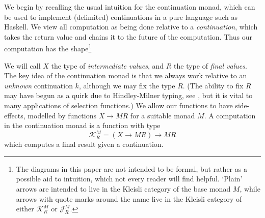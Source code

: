 \documentclass{article}
\newcommand\J{\mathscr J}
\newcommand\K{\mathscr K}
\begin{document}
We begin by recalling the usual intuition for the continuation monad, which can be used to implement (delimited) continuations in a pure language such as Haskell. We view all computation as being done relative to a \emph{continuation}, which takes the return value and chains it to the future of the computation. Thus our computation has the shape\footnote{The diagrams in this paper are not intended to be formal, but rather as a possible aid to intuition, which not every reader will find helpful. `Plain' arrows are intended to live in the Kleisli category of the base monad $M$, while arrows with quote marks around the name live in the Kleisli category of either $\K^M_R$ or $\J^M_R$.}
\begin{center}\end{center}
We will call $X$ the type of \emph{intermediate values}, and $R$ the type of \emph{final values}. The key idea of the continuation monad is that we always work relative to an \emph{unknown} continuation $k$, although we may fix the type $R$. (The ability to fix $R$ may have begun as a quirk due to Hindley-Milner typing, see \citep{kiselyov}, but it is vital to many applications of selection functions.) We allow our functions to have side-effects, modelled by functions $X \to MR$ for a suitable monad $M$. A computation in the continuation monad is a function with type
\[ \K^M_R = (X \to MR) \to MR \]
which computes a final result given a continuation.
\end{document}

